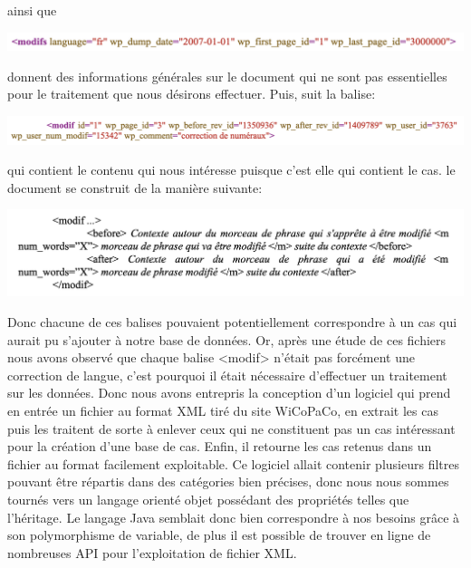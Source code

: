 \documentclass{article}
\begin{document}
ainsi que 

\begin{center}
\includegraphics[width=14cm]{exemple6.png} %
\end{center}

donnent des informations g\'{e}n\'{e}rales sur le document qui ne sont pas essentielles pour le traitement que nous d\'{e}sirons effectuer. 
Puis, suit la balise:
\begin{center}
\includegraphics[width=14cm]{exemple7.png} %
\end{center}

qui contient le contenu qui nous int\'{e}resse puisque c'est elle qui contient le cas. le document se construit de la mani\`{e}re suivante:
\begin{center}
\includegraphics[width=14cm]{exemple8.png} %
\end{center}

Donc chacune de ces balises pouvaient potentiellement correspondre \`{a} un cas qui aurait pu s'ajouter \`{a} notre base de donn\'{e}es. Or, apr\`{e}s une \'{e}tude de ces fichiers nous avons observ\'{e} que chaque balise <modif> n'\'{e}tait pas forc\'{e}ment une correction de langue, c'est pourquoi il \'{e}tait n\'{e}cessaire d'effectuer un traitement sur les donn\'{e}es.
\newline
\newline
Donc nous avons entrepris la conception d'un logiciel qui prend en entr\'{e}e un fichier au format XML tir\'{e} du site WiCoPaCo, en extrait les cas puis les traitent de sorte \`{a} enlever ceux qui ne constituent pas un cas int\'{e}ressant pour la cr\'{e}ation d'une base de cas. Enfin, il retourne les cas retenus dans un fichier au format facilement exploitable.
\newline
\newline
Ce logiciel allait contenir plusieurs filtres pouvant \^{e}tre r\'{e}partis dans des cat\'{e}gories bien pr\'{e}cises, donc nous nous sommes tourn\'{e}s vers un langage orient\'{e} objet poss\'{e}dant des propri\'{e}t\'{e}s telles que l'h\'{e}ritage. Le langage Java semblait donc bien correspondre \`{a} nos besoins gr\^{a}ce \`{a} son polymorphisme de variable, de plus il est possible de trouver en ligne de nombreuses API pour l'exploitation de fichier XML.
\newline
\newline
\end{document}
